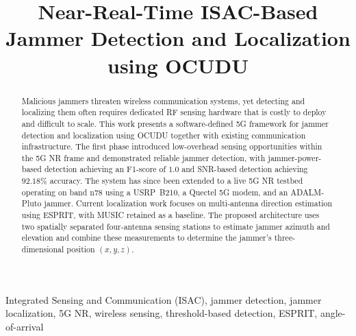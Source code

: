 \documentclass[conference]{IEEEtran}
\begin{document}
\title{Near-Real-Time ISAC-Based Jammer Detection and Localization using OCUDU\\}

\author{
    
    }

\maketitle

\begin{abstract}
Malicious jammers threaten wireless communication systems, yet detecting and
localizing them often requires dedicated RF sensing hardware that is costly to
deploy and difficult to scale. This work presents a software-defined 5G
framework for jammer detection and localization using OCUDU together with
existing communication infrastructure. The first phase introduced low-overhead
sensing opportunities within the 5G NR frame and demonstrated reliable jammer
detection, with jammer-power-based detection achieving an F1-score of $1.0$ and
SNR-based detection achieving $92.18\%$ accuracy. The system has since been
extended to a live 5G NR testbed operating on band n78 using a USRP~B210, a
Quectel 5G modem, and an ADALM-Pluto jammer. Current localization work focuses
on multi-antenna direction estimation using ESPRIT, with MUSIC retained as a
baseline. The proposed architecture uses two spatially separated four-antenna
sensing stations to estimate jammer azimuth and elevation and combine these
measurements to determine the jammer's three-dimensional position $(x, y, z)$.
\end{abstract}

\begin{IEEEkeywords}
Integrated Sensing and Communication (ISAC), jammer detection, jammer
localization, 5G NR, wireless sensing, threshold-based detection,
ESPRIT, angle-of-arrival
\end{IEEEkeywords}
\end{document}
